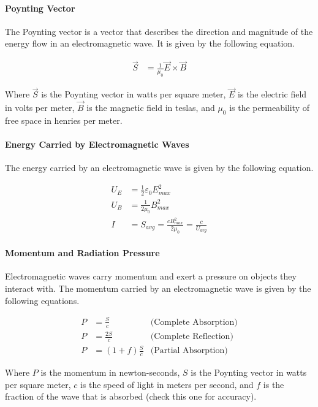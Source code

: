 \paragraph{Poynting Vector}
The Poynting vector is a vector that describes the direction and magnitude of the energy flow in an electromagnetic wave. It is given by the following equation.

\begin{align*}
    \vec{S} &= \frac{1}{\mu_0}\vec{E} \times \vec{B}
\end{align*}

Where $\vec{S}$ is the Poynting vector in watts per square meter, $\vec{E}$ is the electric field in volts per meter, $\vec{B}$ is the magnetic field in teslas,
and $\mu_0$ is the permeability of free space in henries per meter.


\paragraph{Energy Carried by Electromagnetic Waves}
The energy carried by an electromagnetic wave is given by the following equation.

\begin{align*}
    U_E &= \frac{1}{2}\varepsilon_0E_{max}^2\\
    U_B &= \frac{1}{2\mu_0}B_{max}^2\\
    I &= S_{avg} = \frac{cB_{max}^2}{2\mu_0} = \frac{c}{U_{avg}}
\end{align*}

\paragraph{Momentum and Radiation Pressure}
Electromagnetic waves carry momentum and exert a pressure on objects they interact with. The momentum carried by an electromagnetic wave is given by the following 
equations.

\begin{align*}
    P &= \frac{S}{c} &\text{(Complete Absorption)}\\
    P &= \frac{2S}{c} &\text{(Complete Reflection)}\\
    P &= (1 + f) \frac{S}{c} &\text{(Partial Absorption)}
\end{align*}

Where $P$ is the momentum in newton-seconds, $S$ is the Poynting vector in watts per square meter, $c$ is the speed of light in meters per second, 
and $f$ is the fraction of the wave that is absorbed (check this one for accuracy).

